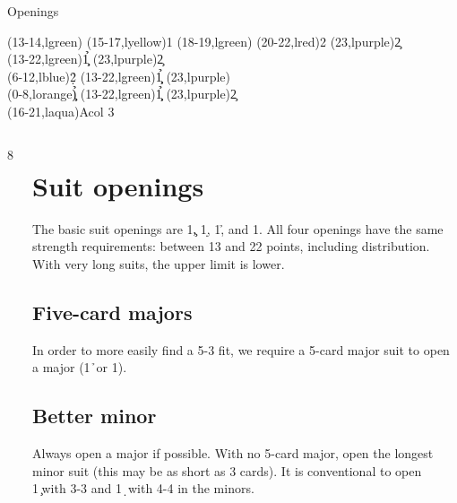 
\begin{sheet}{Openings}

{\strut\hfill
\begin{ptable}
  \bid(13-14,lgreen){}
  \bid(15-17,lyellow){1\nt}
  \bid(18-19,lgreen){}
  \bid(20-22,lred){2\nt}
  \bid*(23,lpurple){2\c}\\
  \bid*(13-22,lgreen){1\c\d\h\s}
  \bid*(23,lpurple){2\c}\\
  \bid(6-12,lblue){2\d\h\s}
  \bid(13-22,lgreen){1\c\d\h\s}
  \bid(23,lpurple){}\\
  \bid(0-8,lorange){\c\d\h\s}
  \bid*(13-22,lgreen){1\c\d\h\s}
  \bid*(23,lpurple){2\c}\\
  \bid(16-21,laqua){Acol 3\nt{}}\\
\end{ptable}\hfill\strut}


\begin{columns}8
\begin{column}[span=3]%
\section{Suit openings}
The basic suit openings are 1\c, 1\d, 1\h, and 1\s.  All four openings have
the same strength requirements: between 13 and 22 points, including
distribution.  With very long suits, the upper limit is lower.
\subsection{Five-card majors}
In order to more easily find a 5-3 fit, we require a 5-card major suit
to open a major (1\h\ or 1\s).
\subsection{Better minor}
Always open a major if possible.  With no 5-card major, open the longest
minor suit (this may be as short as 3 cards).  It is conventional to open
1\c\ with 3-3 and 1\d\ with 4-4 in the minors.
\end{column}


\end{columns}
\end{sheet}

